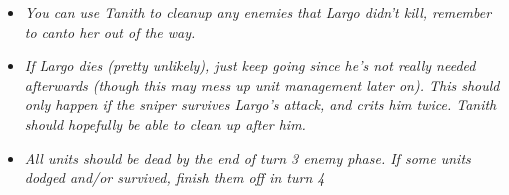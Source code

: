 \begin{tcolorbox}[title=\begin{center}Chapter 25 - Strange Lands\end{center},colbacktitle=blue!50!white]
\begin{enumerate}
\setcounter{enumi}{1}
\end{enumerate}
\vspace{3mm}
\begin{itemize}
    \item \textit{You can use Tanith to cleanup any enemies that Largo didn’t kill, remember to canto her out of the way.}
    \item \textit{If Largo dies (pretty unlikely), just keep going since he’s not really needed afterwards (though this may mess up unit management later on). This should only happen if the sniper survives Largo’s attack, and crits him twice. Tanith should hopefully be able to clean up after him.}
    \item \textit{All units should be dead by the end of turn 3 enemy phase. If some units dodged and/or survived, finish them off in turn 4}
\end{itemize}   
\end{tcolorbox}